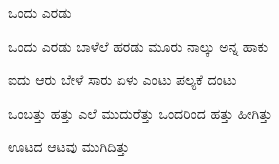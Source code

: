 \documentclass[main.tex]{subfiles}
\begin{document}
{\Huge {ಒಂದು ಎರಡು}
\large
\begin{poem}
  \raggedleft
  \begin{stanza}
    ಒಂದು ಎರಡು ಬಾಳೆಲೆ ಹರಡು \verseline
    ಮೂರು ನಾಲ್ಕು ಅನ್ನ ಹಾಕು
  \end{stanza}
  \begin{stanza}
    ಐದು ಆರು ಬೇಳೆ ಸಾರು \verseline
    ಏಳು ಎಂಟು ಪಲ್ಯಕೆ ದಂಟು
  \end{stanza}
  \begin{stanza}
    ಒಂಬತ್ತು ಹತ್ತು ಎಲೆ ಮುದುರೆತ್ತು \verseline
    ಒಂದರಿಂದ ಹತ್ತು ಹೀಗಿತ್ತು
  \end{stanza}
  \begin{stanza}
    ಊಟದ ಆಟವು ಮುಗಿದಿತ್ತು
  \end{stanza}
  \end{poem}
\raggedleft
}
\end{document}
